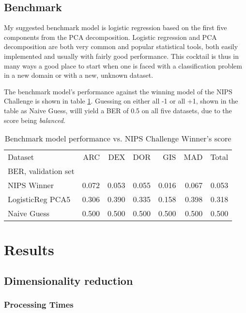 \documentclass[12pt]{article}
\begin{document}
\subsection{Benchmark}

My suggested benchmark model is logistic regression based on the first five components from the PCA decomposition. Logistic regression and PCA decomposition are both very common and popular statistical tools, both easily implemented and usually with fairly good performance. This cocktail is thus in many ways a good place to start when one is faced with a classification problem in a new domain or with a new, unknown dataset.

The benchmark model's performance against the winning model of the NIPS Challenge is shown in table \ref{tab:benchmark}. Guessing on either all -1 or all +1, shown in the table as Naive Guess, willl yield a BER of 0.5 on all five datasets, due to the score being \emph{balanced}.

\begin{table}[h]
\centering
\begin{tabular}{lrrrrrr}
\toprule
Dataset &    ARC &  DEX &  DOR &  GIS &   MAD &     Total \\
BER, validation set \\
\midrule
NIPS Winner 		&  0.072 &  0.053 &  0.055 & 0.016 &  0.067 &  0.053 \\
LogisticReg PCA5	&  0.306 &  0.390 &  0.335 & 0.158 &  0.398 &  0.318 \\
Naive Guess		&  0.500 &  0.500 &  0.500 &  0.500 &  0.500 &  0.500 \\
\bottomrule
\end{tabular}
\caption{\label{tab:benchmark} Benchmark model performance vs. NIPS Challenge Winner's score}
\end{table}




\section{Results}

\subsection{Dimensionality reduction}

\subsubsection{Processing Times}
\end{document}
